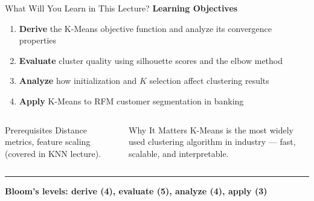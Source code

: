 \documentclass[8pt,aspectratio=169]{beamer}
\newcommand{\bottomnote}[1]{%
\vfill
\vspace{-2mm}
\textcolor{mllavender2}{\rule{\textwidth}{0.4pt}}
\vspace{1mm}
\footnotesize
\textbf{#1}
}
\newcommand{\highlight}[1]{\textcolor{mlorange}{\textbf{#1}}}
\begin{document}
\begin{frame}[t]{What Will You Learn in This Lecture?}
\small
\textbf{Learning Objectives}
\begin{enumerate}
\item \footnotesize \highlight{Derive} the K-Means objective function and analyze its convergence properties
\item \footnotesize \highlight{Evaluate} cluster quality using silhouette scores and the elbow method
\item \footnotesize \highlight{Analyze} how initialization and $K$ selection affect clustering results
\item \footnotesize \highlight{Apply} K-Means to RFM customer segmentation in banking
\end{enumerate}

\vspace{4mm}
\begin{columns}[T]
\begin{block}{Prerequisites}
\footnotesize Distance metrics, feature scaling (covered in KNN lecture).
\end{block}

\begin{block}{Why It Matters}
\footnotesize K-Means is the most widely used clustering algorithm in industry --- fast, scalable, and interpretable.
\end{block}
\end{columns}
\bottomnote{Bloom's levels: derive (4), evaluate (5), analyze (4), apply (3)}
\end{frame}
\end{document}
